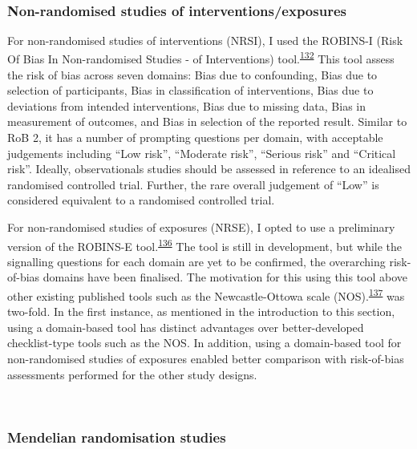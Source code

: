 \documentclass[a4paper, twoside]{templates/ociamthesis}
\begin{document}
~

\hypertarget{non-randomised-studies-of-interventionsexposures}{%
\subsubsection{Non-randomised studies of interventions/exposures}\label{non-randomised-studies-of-interventionsexposures}}

For non-randomised studies of interventions (NRSI), I used the ROBINS-I (Risk Of Bias In Non-randomised Studies - of Interventions) tool.\textsuperscript{\protect\hyperlink{ref-sterne2016}{132}} This tool assess the risk of bias across seven domains: Bias due to confounding, Bias due to selection of participants, Bias in classification of interventions, Bias due to deviations from intended interventions, Bias due to missing data, Bias in measurement of outcomes, and Bias in selection of the reported result. Similar to RoB 2, it has a number of prompting questions per domain, with acceptable judgements including ``Low risk'', ``Moderate risk'', ``Serious risk'' and ``Critical risk''. Ideally, observationals studies should be assessed in reference to an idealised randomised controlled trial. Further, the rare overall judgement of ``Low'' is considered equivalent to a randomised controlled trial.

For non-randomised studies of exposures (NRSE), I opted to use a preliminary version of the ROBINS-E tool.\textsuperscript{\protect\hyperlink{ref-morganr2020}{136}} The tool is still in development, but while the signalling questions for each domain are yet to be confirmed, the overarching risk-of-bias domains have been finalised. The motivation for this using this tool above other existing published tools such as the Newcastle-Ottowa scale (NOS).\textsuperscript{\protect\hyperlink{ref-wells2000}{137}} was two-fold. In the first instance, as mentioned in the introduction to this section, using a domain-based tool has distinct advantages over better-developed checklist-type tools such as the NOS. In addition, using a domain-based tool for non-randomised studies of exposures enabled better comparison with risk-of-bias assessments performed for the other study designs.

~

\hypertarget{mendelian-randomisation-studies}{%
\subsubsection{Mendelian randomisation studies}\label{mendelian-randomisation-studies}}
\end{document}
